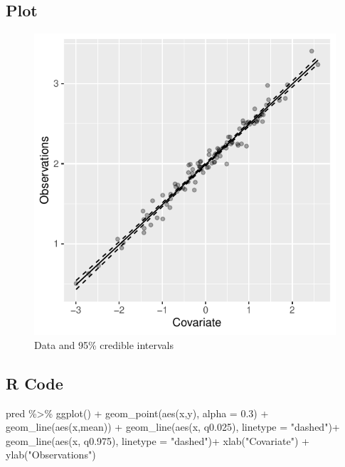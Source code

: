 \documentclass[
  letterpaper,
  DIV=11,
  numbers=noendperiod]{scrartcl}
\newenvironment{Shaded}{\begin{snugshade}}{\end{snugshade}}
\newcommand{\AttributeTok}[1]{\textcolor[rgb]{0.40,0.45,0.13}{#1}}
\newcommand{\FloatTok}[1]{\textcolor[rgb]{0.68,0.00,0.00}{#1}}
\newcommand{\FunctionTok}[1]{\textcolor[rgb]{0.28,0.35,0.67}{#1}}
\newcommand{\NormalTok}[1]{\textcolor[rgb]{0.00,0.23,0.31}{#1}}
\newcommand{\SpecialCharTok}[1]{\textcolor[rgb]{0.37,0.37,0.37}{#1}}
\newcommand{\StringTok}[1]{\textcolor[rgb]{0.13,0.47,0.30}{#1}}
\begin{document}
\subsection{Plot}

\begin{figure}[H]

{\centering \includegraphics{day1_practical_files/figure-pdf/unnamed-chunk-11-1.pdf}

}

\caption{Data and 95\% credible intervals}

\end{figure}%

\subsection{R Code}

\begin{Shaded}
\begin{Highlighting}[]
\NormalTok{pred }\SpecialCharTok{\%\textgreater{}\%} \FunctionTok{ggplot}\NormalTok{() }\SpecialCharTok{+} 
  \FunctionTok{geom\_point}\NormalTok{(}\FunctionTok{aes}\NormalTok{(x,y), }\AttributeTok{alpha =} \FloatTok{0.3}\NormalTok{) }\SpecialCharTok{+}
  \FunctionTok{geom\_line}\NormalTok{(}\FunctionTok{aes}\NormalTok{(x,mean)) }\SpecialCharTok{+}
  \FunctionTok{geom\_line}\NormalTok{(}\FunctionTok{aes}\NormalTok{(x, q0}\FloatTok{.025}\NormalTok{), }\AttributeTok{linetype =} \StringTok{"dashed"}\NormalTok{)}\SpecialCharTok{+}
  \FunctionTok{geom\_line}\NormalTok{(}\FunctionTok{aes}\NormalTok{(x, q0}\FloatTok{.975}\NormalTok{), }\AttributeTok{linetype =} \StringTok{"dashed"}\NormalTok{)}\SpecialCharTok{+}
  \FunctionTok{xlab}\NormalTok{(}\StringTok{"Covariate"}\NormalTok{) }\SpecialCharTok{+} \FunctionTok{ylab}\NormalTok{(}\StringTok{"Observations"}\NormalTok{)}
\end{Highlighting}
\end{Shaded}
\end{document}
